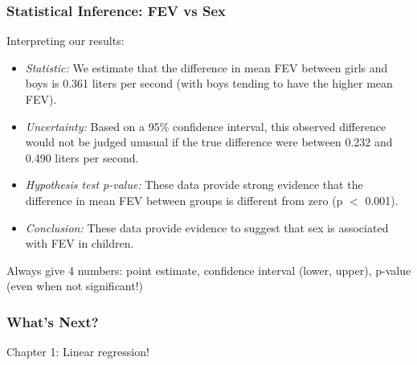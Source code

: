 \documentclass[12pt, 
hyperref={colorlinks=true, linkcolor=blue, urlcolor=cyan}]{beamer}
\begin{document}
\begin{frame}
\frametitle{Statistical Inference: FEV vs Sex}

Interpreting our results:\vspace{-0.3cm}

\begin{itemize}
\item \textit{Statistic:} We estimate that the difference in mean FEV between girls and boys is 0.361 liters per second (with boys tending to have the higher mean FEV). 
\item \textit{Uncertainty:} Based on a 95\% confidence interval, this observed difference would not be judged unusual if the true difference were between 0.232 and 0.490 liters per second.
\item \textit{Hypothesis test p-value:} These data provide strong evidence that the difference in mean FEV between groups is different from zero (p $<$ 0.001).
\item \textit{Conclusion:} These data provide evidence to suggest that sex is associated with FEV in children. \pause
\end{itemize}

\vspace{-0.3cm} \color{blue} Always give 4 numbers: \color{black} point estimate, confidence interval (lower, upper), p-value (even when not significant!)

\end{frame}


\begin{frame}
\frametitle{What's Next?}
 
\center \color{blue} \begin{LARGE} Chapter 1: Linear regression! \end{LARGE} \color{black}

\end{frame}
\end{document}
